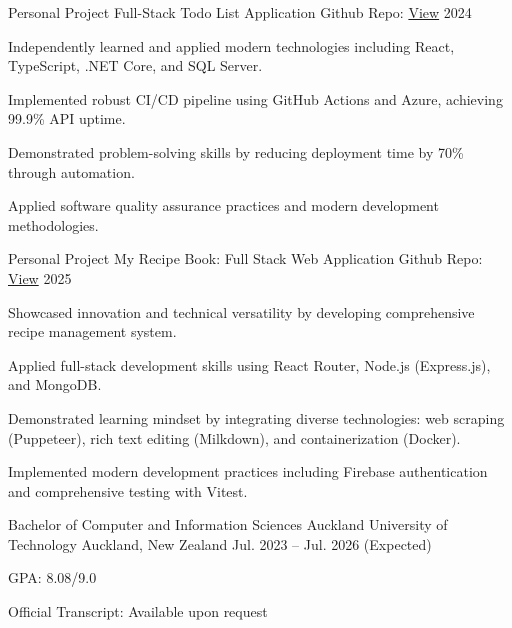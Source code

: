 \documentclass[11pt, a4paper]{awesome-cv}
\begin{document}
\begin{cventries}
  \cventry
    {Personal Project} %
    {Full-Stack Todo List Application} %
    {Github Repo: \href{https://github.com/realYushi/todo-list}{View}} %
    {2024} %
    {
      \begin{cvitems}
        \item {Independently learned and applied modern technologies including React, TypeScript, .NET Core, and SQL Server.}
        \item {Implemented robust CI/CD pipeline using GitHub Actions and Azure, achieving 99.9\% API uptime.}
        \item {Demonstrated problem-solving skills by reducing deployment time by 70\% through automation.}
        \item {Applied software quality assurance practices and modern development methodologies.}
      \end{cvitems}
    }
  \cventry
    {Personal Project} %
    {My Recipe Book: Full Stack Web Application} %
    {Github Repo: \href{https://github.com/realYushi/my-recipe-book}{View}} %
    {2025} %
    {
      \begin{cvitems}
        \item {Showcased innovation and technical versatility by developing comprehensive recipe management system.}
        \item {Applied full-stack development skills using React Router, Node.js (Express.js), and MongoDB.}
        \item {Demonstrated learning mindset by integrating diverse technologies: web scraping (Puppeteer), rich text editing (Milkdown), and containerization (Docker).}
        \item {Implemented modern development practices including Firebase authentication and comprehensive testing with Vitest.}
      \end{cvitems}
    }
\end{cventries}

\begin{cventries}
  \cventry
    {Bachelor of Computer and Information Sciences} %
    {Auckland University of Technology} %
    {Auckland, New Zealand} %
    {Jul. 2023 -- Jul. 2026 (Expected)} %
    {
      \begin{cvitems}
        \item {GPA: 8.08/9.0}
        \item {Official Transcript: Available upon request}
      \end{cvitems}
    }
\end{cventries}
\end{document}
